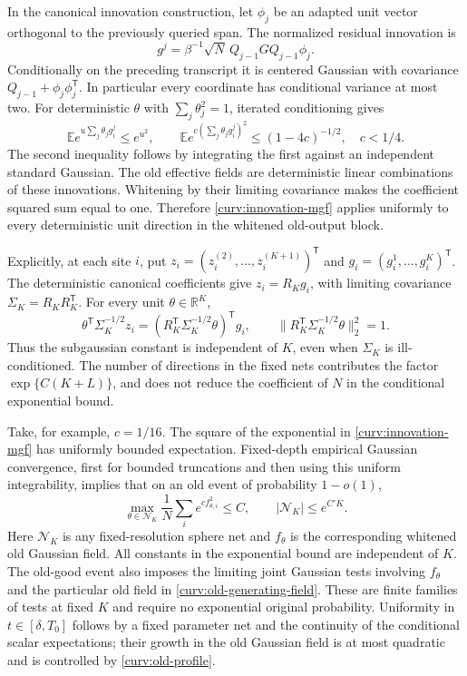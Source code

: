 \documentclass[11pt,reqno]{amsart}
\begin{document}
In the canonical innovation construction, let $\phi_j$ be an adapted unit
vector orthogonal to the previously queried span. The normalized residual
innovation is
\[
          g^j=\beta^{-1}\sqrt N\,Q_{j-1}GQ_{j-1}\phi_j.
\]
Conditionally on the preceding transcript it is centered Gaussian with
covariance $Q_{j-1}+\phi_j\phi_j^{\mathsf T}$. In particular every
coordinate has conditional variance at most two. For deterministic
$\theta$ with $\sum_j\theta_j^2=1$, iterated conditioning gives
\begin{equation}\label{curv:innovation-mgf}
 \mathbb E e^{u\sum_j\theta_jg_i^j}\le e^{u^2},\qquad
 \mathbb E e^{c(\sum_j\theta_jg_i^j)^2}
                         \le(1-4c)^{-1/2},\quad c<1/4.
\end{equation}
The second inequality follows by integrating the first against an
independent standard Gaussian. The old effective fields are deterministic
linear combinations of these innovations. Whitening by their limiting
covariance makes the coefficient squared sum equal to one. Therefore
\eqref{curv:innovation-mgf} applies uniformly to every deterministic unit
direction in the whitened old-output block.

Explicitly, at each site $i$, put
$z_i=(z_i^{(2)},\ldots,z_i^{(K+1)})^{\mathsf T}$ and
$g_i=(g_i^1,\ldots,g_i^K)^{\mathsf T}$. The deterministic canonical
coefficients give $z_i=R_Kg_i$, with limiting covariance
$\Sigma_K=R_KR_K^{\mathsf T}$. For every unit $\theta\in\mathbb R^K$,
\[
 \theta^{\mathsf T}\Sigma_K^{-1/2}z_i
   =(R_K^{\mathsf T}\Sigma_K^{-1/2}\theta)^{\mathsf T}g_i,
 \qquad
 \|R_K^{\mathsf T}\Sigma_K^{-1/2}\theta\|_2^2=1.
\]
Thus the subgaussian constant is independent of $K$, even when
$\Sigma_K$ is ill-conditioned. The number of directions in the fixed
nets contributes the factor $\exp\{C(K+L)\}$, and does not reduce the
coefficient of $N$ in the conditional exponential bound.

Take, for example, $c=1/16$. The square of the exponential in
\eqref{curv:innovation-mgf} has uniformly bounded expectation. Fixed-depth
empirical Gaussian convergence, first for bounded truncations and then
using this uniform integrability, implies that on an old event of
probability $1-o(1)$,
\begin{equation}\label{curv:old-profile}
 \max_{\theta\in\mathcal N_K}
      \frac1N\sum_i e^{c f_{\theta,i}^2}\le C,
 \qquad |\mathcal N_K|\le e^{C'K}.
\end{equation}
Here $\mathcal N_K$ is any fixed-resolution sphere net and $f_\theta$ is
the corresponding whitened old Gaussian field. All constants in the
exponential bound are independent of $K$. The old-good event also imposes
the limiting joint Gaussian tests involving $f_\theta$ and the particular
old field in \eqref{curv:old-generating-field}. These are finite families
of tests at fixed $K$ and require no exponential original probability.
Uniformity in $t\in[\delta,T_0]$ follows by a fixed parameter net and the
continuity of the conditional scalar expectations; their growth in the
old Gaussian field is at most quadratic and is controlled by
\eqref{curv:old-profile}.
\end{document}

